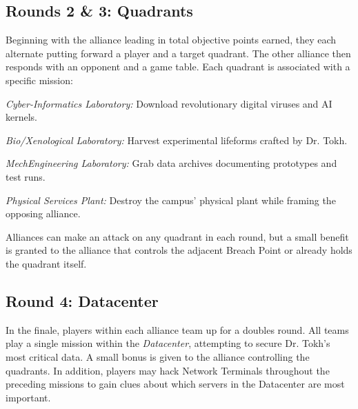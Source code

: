 \subsection{Rounds 2 \& 3: Quadrants}

Beginning with the alliance leading in total objective points earned,
they each alternate putting forward a player and a target quadrant.
The other alliance then responds with an opponent and a game table.
Each quadrant is associated with a specific mission:

\begin{squishitemize}
\item \textit{Cyber-Informatics Laboratory:} Download revolutionary
  digital viruses and AI kernels.
  
\item \textit{Bio/Xenological Laboratory:} Harvest experimental
  lifeforms crafted by Dr. Tokh.
  
\item \textit{MechEngineering Laboratory:} Grab data archives
  documenting prototypes and test runs.
  
\item \textit{Physical Services Plant:} Destroy the campus' physical
  plant while framing the opposing alliance.
  
\end{squishitemize}

Alliances can make an attack on any quadrant in each round, but a
small benefit is granted to the alliance that controls the adjacent
Breach Point or already holds the quadrant itself.

\subsection{Round 4: Datacenter}

In the finale, players within each alliance team up for a doubles
round.  All teams play a single mission within the
\textit{Datacenter}, attempting to secure Dr. Tokh's most critical
data.  A small bonus is given to the alliance controlling the
quadrants.  In addition, players may hack Network Terminals throughout
the preceding missions to gain clues about which servers in the
Datacenter are most important.
